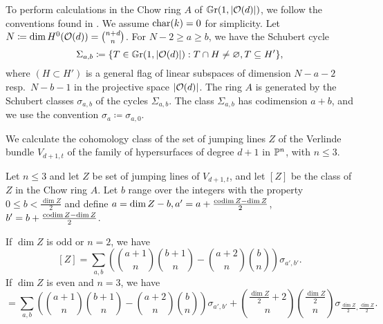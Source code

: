 To perform calculations in the Chow ring $A$ of $\mathbb G \mathrm r(1,\lvert\mathcal{O}(d)\rvert)$, we follow the conventions found in \cite{eisenbud-harris-intersection-theory}. We assume $\operatorname{char}(k) = 0$ for simplicity. Let $N\coloneqq \dim H^0(\mathcal{O}(d)) = \binom{n+d}{n}$. For $N-2\geq a\geq b$, we have the Schubert cycle 
\[
	\Sigma_{a,b}\coloneqq \{T \in \mathbb G \mathrm r(1,\lvert\mathcal{O}(d)\rvert) : T \cap H \neq \varnothing, T \subseteq H'\},
\]
where $(H\subset H')$ is a general flag of linear subspaces of dimension $N-a-2$ resp.\ $N-b-1$ in the projective space $\lvert\mathcal{O}(d)\rvert$.
The ring $A$ is generated by the Schubert classes $\sigma_{a,b}$ of the cycles $\Sigma_{a,b}$.
The class $\Sigma_{a,b}$ has codimension $a+b$, and we use the convention $\sigma_{a}\coloneqq \sigma_{a,0}$.

We calculate the cohomology class of the set of jumping lines $Z$ of the Verlinde bundle $V_{d+1,t}$ of the family of hypersurfaces of degree $d+1$ in $\mathbb{P}^n$, with $n\leq 3$.


\begin{proposition}
	Let $n \leq 3$ and let $Z$ be set of jumping lines of $V_{d+1,t}$, and let $[Z]$ be the class of $Z$ in the Chow ring $A$. Let $b$ range over the integers with the property $0\leq b < \frac{\dim Z}{2}$ and define $a=\dim Z - b, a'=a+\frac{\operatorname{codim} Z-\dim Z}{2}$, $b'=b+\frac{\operatorname{codim} Z-\dim Z}{2}$.
	\begin{enumerate}
		\huyitem If $\dim Z$ is odd or $n=2$, we have
		\begin{equation} \label{class-of-locus}
			[Z] = \sum_{a,b} \left({\binom{a+1}{n}}{\binom{b+1}{n}}-{\binom{a+2}{n}}{\binom{b}{n}}\right) \sigma_{a',b'}. 
		\end{equation}
		\huyitem If $\dim Z$ is even and $n=3$, we have
		\begin{equation*}
			[Z] = \sum_{a,b} \left({\binom{a+1}{n}}{\binom{b+1}{n}}-{\binom{a+2}{n}}{\binom{b}{n}}\right) \sigma_{a',b'}
			+
			\binom{\frac{\dim Z}{2} + 2}{n}\binom{\frac{\dim Z}{2}}{n}\sigma_{\frac{\dim Z}{2},\frac{\dim Z}{2}}.
		\end{equation*}
	\end{enumerate}
\end{proposition}

